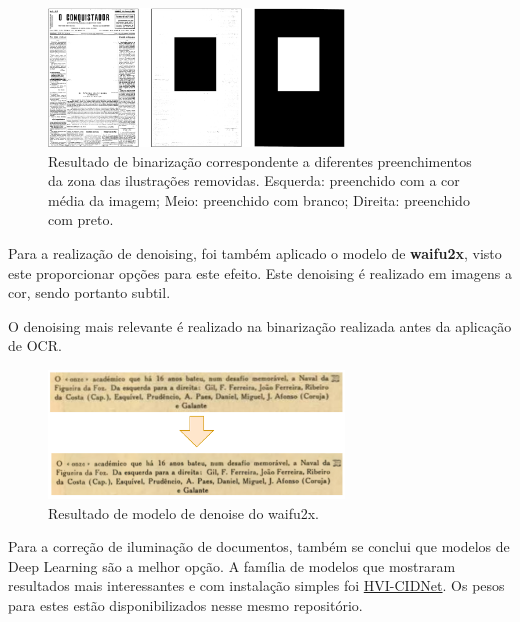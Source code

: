 \begin{figure}[H]
	\centering
	\includegraphics[width=0.7\textwidth]{images/ilustracoes/binarize_remove_images_example.png}
	\caption{Resultado de binarização correspondente a diferentes preenchimentos da zona das ilustrações removidas. Esquerda: preenchido com a cor média da imagem; Meio: preenchido com branco; Direita: preenchido com preto.}
	\label{fig:binarize_remove_images_example}
\end{figure}


Para a realização de denoising, foi também aplicado o modelo de \textbf{waifu2x}, visto este proporcionar opções para este efeito. Este denoising é realizado em imagens a cor, sendo portanto subtil.

O denoising mais relevante é realizado na binarização realizada antes da aplicação de OCR.

\begin{figure}[H]
	\centering
	\includegraphics[width=0.7\textwidth]{images/ilustracoes/denoise_example.png}
	\caption{Resultado de modelo de denoise do waifu2x.}
	\label{fig:denoise_example}
\end{figure}




Para a correção de iluminação de documentos, também se conclui que modelos de Deep Learning são a melhor opção. A família de modelos que mostraram resultados mais interessantes e com instalação simples foi \href{https://github.com/Fediory/HVI-CIDNet}{HVI-CIDNet}. Os pesos para estes estão disponibilizados nesse mesmo repositório.

